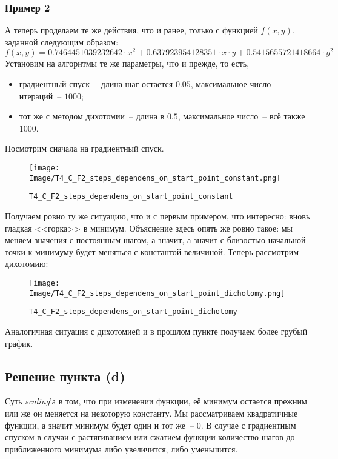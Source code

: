 \documentclass[12pt, a4paper, oneside, final]{article}
\begin{document}
	\subsubsection*{Пример 2}
	А теперь проделаем те же действия, что и ранее, только с функцией $f(x, y)$, заданной следующим образом:
	\[
		f(x, y) = 0.7464451039232642 \cdot x^{2} + 0.637923954128351 \cdot x \cdot y + 0.5415655721418664 \cdot y^{2}
	\]
	Установим на алгоритмы те же параметры, что и прежде, то есть,
	\begin{itemize}
		\item градиентный спуск~-- длина шаг остается $0.05$, максимальное число итераций~-- $1000$;
		\item тот же с методом дихотомии~-- длина в $0.5$, максимальное число~-- всё также $1000$.
	\end{itemize}
	Посмотрим сначала на градиентный спуск.
	\begin{figure}[H]
		\centering
		\texttt{[image: Image/T4\_C\_F2\_steps\_dependens\_on\_start\_point\_constant.png]}
		\caption*{\texttt{T4\_C\_F2\_steps\_dependens\_on\_start\_point\_constant}}
	\end{figure}
	Получаем ровно ту же ситуацию, что и с первым примером, что интересно: вновь гладкая <<горка>> в минимум. Объяснение здесь опять же ровно такое: мы меняем значения с постоянным шагом, а значит, а значит с близостью начальной точки к минимуму будет меняться с константой величиной. Теперь рассмотрим дихотомию:
	\begin{figure}[H]
		\centering
		\texttt{[image: Image/T4\_C\_F2\_steps\_dependens\_on\_start\_point\_dichotomy.png]}
		\caption*{\texttt{T4\_C\_F2\_steps\_dependens\_on\_start\_point\_dichotomy}}
	\end{figure}
	Аналогичная ситуация с дихотомией и в прошлом пункте получаем более грубый график.
	\subsection*{Решение пункта (d)}
	Суть \textit{scaling}'а в том, что при изменении функции, её минимум остается прежним или же он меняется на некоторую константу. Мы рассматриваем квадратичные функции, а значит минимум будет один и тот же~-- $0$. В случае с градиентным спуском в случаи с растягиванием или сжатием функции количество шагов до приближенного минимума либо увеличится, либо уменьшится.
\end{document}
